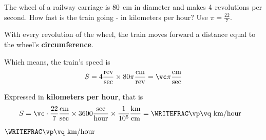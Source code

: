 

\MULTIPLY\va\vb\vc
\FRACTIONSIMPLIFY{}\vx\vy
\FRACMULT\vx{}\vp\vq

\question[2] The wheel of a railway carriage is $80$ cm in diameter and makes $4$ revolutions 
per second. How fast is the train going - in kilometers per hour? Use $\pi=\frac{22}{7}$.

\watchout

\begin{solution}[\mcq]
  With every revolution of the wheel, the train moves forward a distance equal to the wheel's \textbf{circumference}.

  Which means, the train's speed is 
  \[ S = \vb\dfrac{\text{rev}}{\text{sec}} \times\va\pi\dfrac{\text{cm}}{\text{rev}} = \vc\pi\dfrac{\text{cm}}{\text{sec}} \]

  Expressed in \textbf{kilometers per hour}, that is 
  \begin{align}
    S &= \vc\cdot\dfrac{22}{7}\dfrac{\text{cm}}{\text{sec}}\times 3600\dfrac{\text{sec}}{\text{hour}}\times\dfrac{1}{10^5}\dfrac{\text{km}}{\text{cm}}
      = \WRITEFRAC\vp\vq\text{ km/hour}
  \end{align} 


\end{solution}
\ifprintanswers
  \begin{codex}
    $\WRITEFRAC\vp\vq\text{ km/hour}$
  \end{codex}
\fi
